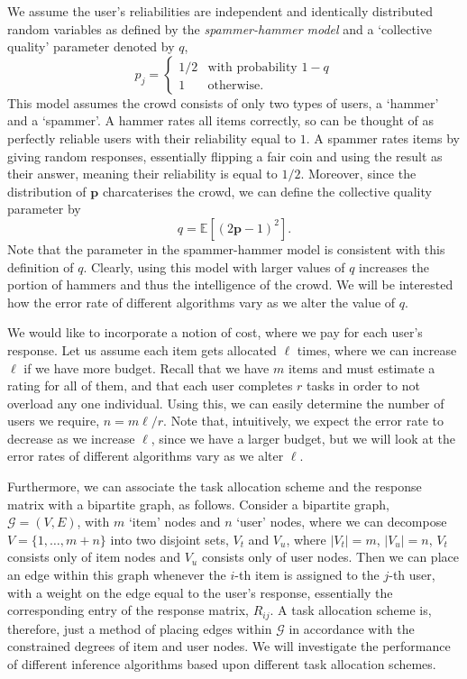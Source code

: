 \documentclass[12pt]{article}
\numberwithin{equation}{section}
\begin{document}
We assume the user's reliabilities are independent and identically distributed random variables as defined by the \textit{spammer-hammer model} and a `collective quality' parameter denoted by $q$,
\begin{equation}
	p_{j} =
	\begin{cases}
		1/2 & \text{with probability } 1-q\\
		1 & \text{otherwise}.
	\end{cases}
\end{equation}
This model assumes the crowd consists of only two types of users, a `hammer' and a `spammer'. A hammer rates all items correctly, so can be thought of as perfectly reliable users with their reliability equal to $1$. A spammer rates items by giving random responses, essentially flipping a fair coin and using the result as their answer, meaning their reliability is equal to $1/2$.  Moreover, since the distribution of $\mathbf{p}$ charcaterises the crowd, we can define the collective quality parameter by
\begin{equation}
	q = \mathbb{E}[(2\mathbf{p}-1)^{2}].
\end{equation}
Note that the parameter in the spammer-hammer model is consistent with this definition of $q$.
Clearly, using this model with larger values of $q$ increases the portion of hammers and thus the intelligence of the crowd. We will be interested how the error rate of different algorithms vary as we alter the value of $q$.

We would like to incorporate a notion of cost, where we pay for each user's response. Let us assume each item gets allocated $\ell$ times, where we can increase $\ell$ if we have more budget. Recall that we have $m$ items and must estimate a rating for all of them, and that each user completes $r$ tasks in order to not overload any one individual. Using this, we can easily determine the number of users we require, $n = m\ell/r$. Note that, intuitively, we expect the error rate to decrease as we increase $\ell$, since we have a larger budget, but we will look at the error rates of different algorithms vary as we alter $\ell$.

Furthermore, we can associate the task allocation scheme and the response matrix with a bipartite graph, as follows. Consider a bipartite graph, $\mathcal{G} = (V,E)$, with $m$ `item' nodes and $n$ `user' nodes, where we can decompose $V=\{1,\dots,m+n\}$ into two disjoint sets, $V_{t}$ and $V_{u}$, where $\left\vert{V_{t}}\right\vert = m$, $\left\vert{V_{u}}\right\vert = n$, $V_{t}$ consists only of item nodes and $V_{u}$ consists only of user nodes. Then we can place an edge within this graph whenever the $i$-th item is assigned to the $j$-th user, with a weight on the edge equal to the user's response, essentially the corresponding entry of the response matrix, $R_{ij}$. A task allocation scheme is, therefore, just a method of placing edges within $\mathcal{G}$ in accordance with the constrained degrees of item and user nodes. We will investigate the performance of different inference algorithms based upon different task allocation schemes.
\end{document}
